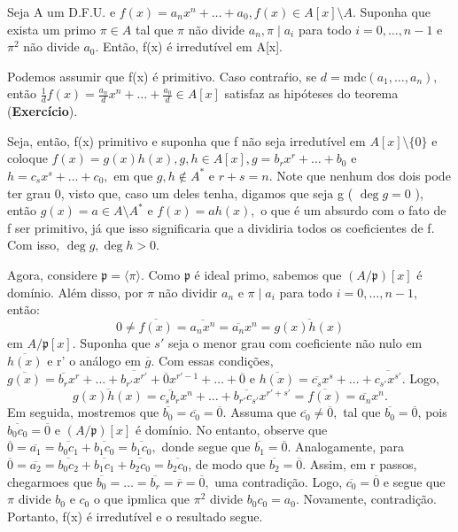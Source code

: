 \documentclass[AlgebraII/algebraII_notes.tex]{subfiles}
\begin{document}
\begin{theorem*}
	Seja A um D.F.U. e \(f(x) = a_{n}x^{n} + \dotsc + a_{0}, f(x)\in A[x]\setminus{A}.\) Suponha que exista um primo \(\pi \in A\) tal que
	\(\pi \) não divide \(a_{n}, \pi \mid a_{i}\) para todo \(i=0, \dotsc , n-1\) e \(\pi^{2}\) não divide \(a_{0}\). Então, f(x) é irredutível em
	A[x].
\end{theorem*}
\begin{proof*}
	Podemos assumir que f(x) é primitivo. Caso contraŕio, se \(d = \mathrm{mdc}(a_{1}, \dotsc ,a_{n}),\) então
	\(\frac{1}{d}f(x) = \frac{a_{n}}{d}x^{n} + \dotsc + \frac{a_{0}}{d}\in A[x]\) satisfaz as hipóteses do teorema (\textbf{Exercício}).

	Seja, então, f(x) primitivo e suponha que f não seja irredutível em \(A[x]\setminus{\{0\}}\) e coloque
	\(f(x) = g(x)h(x), g, h\in A[x], g = b_{r}x^{r} + \dotsc  + b_{0}\) e \(h = c_{s}x^{s} + \dotsc +c_{0},\) em que
	\(g,h\not\in A^{*}\) e \(r+s = n.\) Note que nenhum dos dois pode ter grau 0, visto que, caso um deles tenha, digamos que seja g ( \(\deg{g} = 0\) ), então
	\(g(x)=a\in A\setminus{A^{*}}\) e \(f(x) = ah(x),\) o que é um absurdo com o fato de f ser primitivo, já que isso significaria que a dividiria todos os coeficientes
	de f. Com isso, \(\deg{g}, \deg{h} > 0.\)

	Agora, considere \(\mathfrak{p} = \langle \pi  \rangle.\) Como \(\mathfrak{p}\) é ideal primo, sabemos que
	\((A/\mathfrak{p})[x]\) é domínio. Além disso, por \(\pi \) não dividir \(a_{n}\) e \(\pi \mid a_{i}\) para todo \(i=0, \dotsc , n-1,\) então:
	\[
		0\neq \overline{f(x)} = \overline{a_{n}x^{n}} = \overline{a_{n}}x^{n} = \overline{g(x)h(x)}
	\]
	em \(A/\mathfrak{p}[x].\) Suponha que \(s'\) seja o menor grau com coeficiente não nulo em \(\overline{h(x)}\) e r' o análogo em \(\overline{g}.\)
	Com essas condições, \(\overline{g(x)} = \overline{b_{r}}x^{r} + \dotsc + \overline{b_{r'}x^{r'}} + \overline{0}x^{r'-1} + \dotsc + \overline{0}\) e
	\(\overline{h(x)} = \overline{c_{s}}x^{s} + \dotsc + \overline{c_{s'}x^{s'}}.\) Logo,
	\[
		\overline{g(x)h(x)} = \overline{c_{s}b_{r}}x^{n} + \dotsc + \overline{b_{r'}c_{s'}}x^{r'+s'} = \overline{f(x)} = \overline{a_{n}}x^{n}.
	\]
	Em seguida, mostremos que \(\overline{b_{0}} = \overline{c_{0}} = \overline{0}.\) Assuma que \(\overline{c_{0}}\neq \overline{0},\) tal que \(\overline{b_{0}}=\overline{0}\), pois
	\(\overline{b_{0}c_{0}} = \overline{0}\) e \((A/\mathfrak{p})[x]\) é domínio. No entanto, observe que \(\overline{0} = \overline{a_{1}} = \overline{b_{0}c_{1}} + \overline{b_{1}c_{0}} = \overline{b_{1}c_{0}},\)
	donde segue que \(\overline{b_{1}} = \overline{0}.\) Analogamente, para \(\overline{0} = \overline{a_{2}} = \overline{b_{0}c_{2}}+\overline{b_{1}c_{1}}+\overline{b_{2}c_{0}} = \overline{b_{2}c_{0}}\),
	de modo que \(\overline{b_{2}} = \overline{0}.\) Assim, em r passos, chegarmoes que \(\overline{b_{0}} = \dotsc = \overline{b_{r}} = \overline{r} = \overline{0},\) uma contradição.
	Logo, \(\overline{c_{0}} = \overline{0}\) e segue que \(\pi \) divide \(b_{0}\) e \(c_{0}\) o que ipmlica que \(\pi^{2}\) divide \(b_{0}c_{0} = a_{0}.\) Novamente,
	contradição. Portanto, f(x) é irredutível e o resultado segue. \qedsymbol
\end{proof*}
\end{document}
